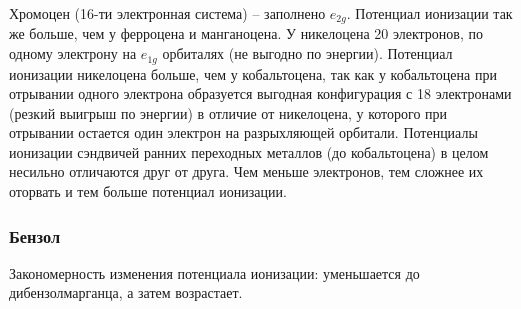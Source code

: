 Хромоцен (16-ти электронная система) – заполнено $e_{2g}$. Потенциал ионизации так же больше, чем у ферроцена и манганоцена. 
У никелоцена 20 электронов, по одному электрону на $e_{1g}$ орбиталях (не выгодно по энергии). Потенциал ионизации никелоцена больше, чем у кобальтоцена, так как у кобальтоцена при отрывании одного электрона образуется выгодная конфигурация с 18 электронами (резкий выигрыш по энергии) в отличие от никелоцена, у которого при отрывании остается один электрон на разрыхляющей орбитали. 
Потенциалы ионизации сэндвичей ранних переходных металлов (до кобальтоцена) в целом несильно отличаются друг от друга. Чем меньше электронов, тем сложнее их оторвать и тем больше потенциал ионизации. 

\subsubsection{Бензол}

Закономерность изменения потенциала ионизации: уменьшается до дибензолмарганца, а затем возрастает. 


